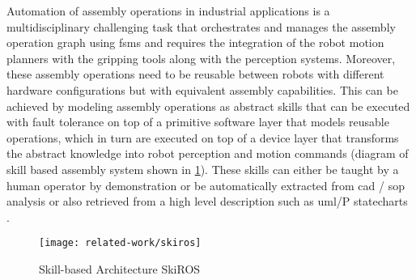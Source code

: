 Automation of assembly operations in industrial applications \cite{Thomas2001,Patel2012} is a multidisciplinary challenging task that orchestrates and manages the assembly operation graph using \glspl{fsm} \cite{Smits2010,Stefan2014} and requires the integration of the robot motion planners with the gripping tools \cite{Thomas2015} along with the perception systems. Moreover, these assembly operations need to be reusable \cite{Andersen2014,Butting2016} between robots with different hardware configurations \cite{Thomas2002} but with equivalent assembly capabilities. This can be achieved by modeling assembly operations as abstract skills \cite{aimm2012,Pedersen2014,Holz2015,Rovida2017} that can be executed with fault tolerance \cite{ThomasICRA2003} on top of a primitive software layer that models reusable operations, which in turn are executed on top of a device layer that transforms the abstract knowledge into robot perception and motion commands (diagram of skill based assembly system shown in \cref{fig:skiros}). These skills can either be taught by a human operator by demonstration or be automatically extracted from \gls{cad} / \gls{sop} analysis \cite{Lavoue2005,Tenorth2013cad} or also retrieved from a high level description such as \gls{uml}/P statecharts \cite{ThomasICRA2013}.


\begin{figure}[H]
	\centering
	\texttt{[image: related-work/skiros]}
	\caption[Skill-based Architecture SkiROS]{Skill-based Architecture SkiROS \cite{Holz2015}}
	\label{fig:skiros}
\end{figure}





